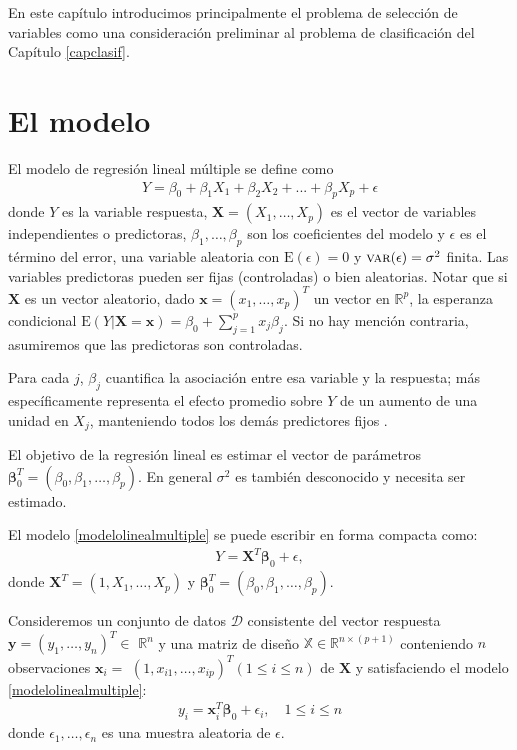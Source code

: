 \documentclass{report}
\def \espe  {\text{E}}
\def \var  {\text{VAR}}
\def \var  {\mbox{\sc var}}
\begin{document}
 En este capítulo introducimos principalmente el problema de selección de variables como una consideración preliminar al problema de clasificación del Capítulo \ref{capclasif}.
 

\section{El modelo}




 El modelo de regresión lineal múltiple se define como 
\begin{eqnarray}\label{modelolinealmultiple}
Y=\beta_0+\beta_1X_1+\beta_2 X_2+...+\beta_pX_p+ \epsilon
\end{eqnarray}
donde $Y$ es la variable respuesta, $\mathbf{X}=(X_1, \ldots, X_p)$  es el vector de variables independientes o predictoras, $\beta_1, \ldots, \beta_p$ son los coeficientes del modelo y $\epsilon$ es el término del error, una variable aleatoria con $\espe(\epsilon)=0$ y $\var(\epsilon)=\sigma^2$ finita.   Las variables predictoras pueden ser fijas (controladas) o bien aleatorias.  
Notar que si $\mathbf{X}$ es un vector aleatorio, dado $\mathbf{x}=(x_1, \ldots, x_p)^T$ un vector en $\mathbb{R}^p$, la esperanza condicional  $\espe (Y|\mathbf{X}=\mathbf{x})=\beta_0+\sum_{j=1}^{p}x_j\beta_j$. Si no hay mención contraria, asumiremos que las predictoras son controladas. 


 Para cada $j$, $\beta_j$ cuantifica la asociación entre esa variable y la respuesta; más específicamente representa el efecto promedio sobre $Y$ de un aumento de una unidad en $X_j$, manteniendo todos los demás predictores fijos \citep[p.~72]{james2021}. 


 El objetivo de la regresión lineal es estimar el vector de parámetros $\boldsymbol{\beta}_0^T=(\beta_0,\beta_1,\ldots, \beta_p)$. En general $\sigma^2$ es también desconocido y necesita ser estimado. 


 El modelo \eqref{modelolinealmultiple} se puede escribir en forma compacta como:
\begin{eqnarray}\label{modelolinealmultiplevec}
Y=\mathbf{X}^T \boldsymbol{\beta}_0+ \epsilon,
\end{eqnarray}
donde $\mathbf{X}^T=(1,X_1,\ldots, X_p)$ y $\boldsymbol{\beta}_0^T=(\beta_0,\beta_1,\ldots, \beta_p)$. 




 Consideremos un conjunto de datos $\mathcal{D}$ consistente del vector respuesta $\mathbf{y}=\left(y_1, \ldots, y_n\right)^T \in$ $\mathbb{R}^n$ y una matriz de diseño $\mathbb{X} \in \mathbb{R}^{n \times (p+1)}$ conteniendo $n$ observaciones $\mathbf{x}_i=$ $\left(1,x_{i 1}, \ldots, x_{i p}\right)^T(1 \leq i \leq n)$ de $\mathbf{X}$ y satisfaciendo el modelo \eqref{modelolinealmultiple}:
\begin{eqnarray}\label{modelolinealmultiplen}
y_i=\mathbf{x}_i^T \boldsymbol{\beta}_0+  \epsilon_i, \quad 1 \leq i \leq n
\end{eqnarray}
donde  $\epsilon_1, \ldots, \epsilon_n$ es una muestra aleatoria de $\epsilon$.
\end{document}
